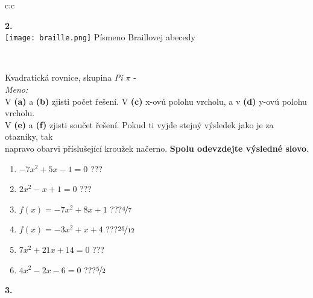 \documentclass[10pt]{report}
\begin{document}
\begin{tabular}{c:c}
\begin{minipage}[c][99mm][t]{0.49\linewidth}
\begin{center}
\begin{minipage}{0.20\linewidth}
\begin{center}
{\Huge\bfseries 2.} \\[2mm]
\texttt{[image: braille.png]}
{\small Písmeno Braillovej abecedy}
\end{center}
\end{minipage}
\end{center}
\end{minipage}
\\ \hdashline
\begin{minipage}[c][99mm][t]{0.49\linewidth}
\begin{center}
\vspace{7mm}
{\huge Kvadratická rovnice, skupina \textit{Pi $\pi$} -}\\[4.5mm]
\textit{Meno:}\phantom{xxxxxxxxxxxxxxxxxxxxxxxxxxxxxxxxxxxxxxxxxxxxxxxxxxxxxxxxxxxxxxxxx}\\[3.5mm]
V \textbf{(a)} a \textbf{(b)} zjisti počet řešení. V \textbf{(c)} x-ovú polohu vrcholu, a v \textbf{(d)} y-ovú polohu vrcholu.\\V \textbf{(e)} a \textbf{(f)} zjisti součet řešení. Pokud ti vyjde stejný výsledek jako je za otazníky, tak\\napravo obarvi příslušející kroužek načerno. \textbf{Spolu odevzdejte výsledné slovo}.\\[3mm]
\begin{minipage}{0.77\linewidth}
\begin{center}
\begin{varwidth}{\textwidth}
\begin{enumerate}
\large
\item $-7x^2+5x-1=0$\quad \dotfill\; ???\;\dotfill {}
\item $2x^2-x+1=0$\quad \dotfill\; ???\;\dotfill {}
\item $f(x)=-7x^2+8x+1$\quad \dotfill\; ???\;\dotfill \quad $\nicefrac{4}{7}$
\item $f(x)=-3x^2+x+4$\quad \dotfill\; ???\;\dotfill \quad $\nicefrac{25}{12}$
\item $7x^2+21x+14=0$\quad \dotfill\; ???\;\dotfill {}
\item $4x^2-2x-6=0$\quad \dotfill\; ???\;\dotfill \quad $\nicefrac{5}{2}$
\end{enumerate}
\end{varwidth}
\end{center}
\end{minipage}
\begin{minipage}{0.20\linewidth}
\begin{center}
{\Huge\bfseries 3.} \\[2mm]

\end{center}
\end{minipage}
\end{center}
\end{minipage}
\end{tabular}
\end{document}
